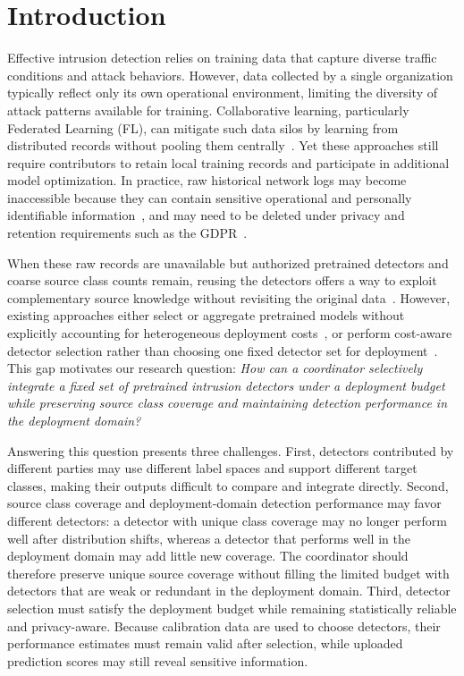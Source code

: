 \documentclass[conference]{IEEEtran}
\theoremstyle{definition}
\begin{document}
\IEEEpeerreviewmaketitle

\section{Introduction}
\label{sec:introduction}

Effective intrusion detection relies on training data that capture diverse traffic conditions and attack behaviors.
However, data collected by a single organization typically reflect only its own operational environment, limiting the diversity of attack patterns available for training.
Collaborative learning, particularly Federated Learning (FL), can mitigate such data silos by learning from distributed records without pooling them centrally~\cite{federated_learning,Fedprox,ditto2021,zhao2023fedprompt}.
Yet these approaches still require contributors to retain local training records and participate in additional model optimization.
In practice, raw historical network logs may become inaccessible because they can contain sensitive operational and personally identifiable information~\cite{nist2016threatsharing,xu2026entente}, and may need to be deleted under privacy and retention requirements such as the GDPR~\cite{gdpr2018general}.

When these raw records are unavailable but authorized pretrained detectors and coarse source class counts remain, reusing the detectors offers a way to exploit complementary source knowledge without revisiting the original data~\cite{old_dogs2019}.
However, existing approaches either select or aggregate pretrained models without explicitly accounting for heterogeneous deployment costs~\cite{dong2022zood,zhao2024modelglue}, or perform cost-aware detector selection rather than choosing one fixed detector set for deployment~\cite{birman2022spirel}.
This gap motivates our research question: \emph{How can a coordinator selectively integrate a fixed set of pretrained intrusion detectors under a deployment budget while preserving source class coverage and maintaining detection performance in the deployment domain?}

Answering this question presents three challenges.
First, detectors contributed by different parties may use different label spaces and support different target classes, making their outputs difficult to compare and integrate directly.
Second, source class coverage and deployment-domain detection performance may favor different detectors: a detector with unique class coverage may no longer perform well after distribution shifts, whereas a detector that performs well in the deployment domain may add little new coverage.
The coordinator should therefore preserve unique source coverage without filling the limited budget with detectors that are weak or redundant in the deployment domain.
Third, detector selection must satisfy the deployment budget while remaining statistically reliable and privacy-aware.
Because calibration data are used to choose detectors, their performance estimates must remain valid after selection, while uploaded prediction scores may still reveal sensitive information.
\end{document}
